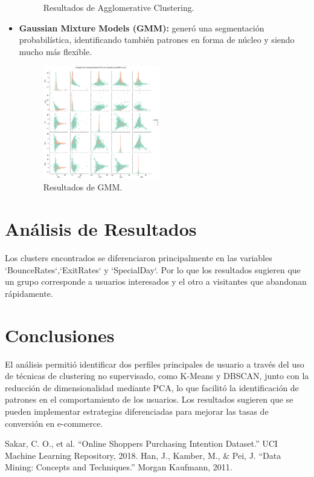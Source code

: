 \documentclass[conference]{IEEEtran}
\begin{document}
\begin{itemize}
\begin{figure}[H]
            \caption{Resultados de Agglomerative Clustering.}
            \label{fig:agglomerative}
        \end{figure}
    \item \textbf{Gaussian Mixture Models (GMM):} generó una segmentación probabilística, identificando también patrones en forma de núcleo y siendo mucho más flexible.
        \begin{figure}[H]
            \centering
            \includegraphics[width=0.48\textwidth]{images/gmm.png}
            \caption{Resultados de GMM.}
            \label{fig:gmm}
        \end{figure}
\end{itemize}

\section{Análisis de Resultados}
Los clusters encontrados se diferenciaron principalmente en las variables `BounceRates`,`ExitRates` y `SpecialDay`. Por lo que los resultados sugieren que un grupo corresponde a usuarios interesados y el otro a visitantes que abandonan rápidamente.

\section{Conclusiones}
El análisis permitió identificar dos perfiles principales de usuario a través del uso de técnicas de clustering no supervisado, como K-Means y DBSCAN, junto con la reducción de dimensionalidad mediante PCA, lo que facilitó la identificación de patrones en el comportamiento de los usuarios. Los resultados sugieren que se pueden implementar estrategias diferenciadas para mejorar las tasas de conversión en e-commerce.

\begin{thebibliography}{99}
 Sakar, C. O., et al. “Online Shoppers Purchasing Intention Dataset.” UCI Machine Learning Repository, 2018.
 Han, J., Kamber, M., \& Pei, J. “Data Mining: Concepts and Techniques.” Morgan Kaufmann, 2011.
\end{thebibliography}
\end{document}
